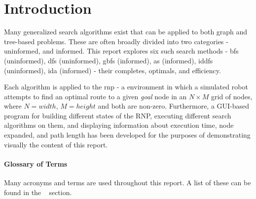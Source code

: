 \section{Introduction} %
\label{sec:introduction}
Many generalized search algorithms exist that can be applied to both graph and tree-based problems. These are often broadly divided into two categories - \Gls{uninformed}, and \Gls{informed}. This report explores six such search methods - \acrfull{bfs} (uninformed), \acrfull{dfs} (uninformed), \acrfull{gbfs} (informed), \acrfull{as} (informed), \acrfull{iddfs} (uninformed), \acrfull{ida} (informed) - their \glspl{complete}, \glspl{optimal}, and efficiency. \par
Each algorithm is applied to the \acrlong{rnp} - a \Gls{environment} in which a simulated robot attempts to find an optimal route to a given \textit{goal} \gls{node} in an $N \times M$ grid of nodes, where $N=width$, $M=height$ and both are non-zero. Furthermore, a GUI-based program for building different states of the RNP, executing different search algorithms on them, and displaying information about execution time, node expanded, and path length has been developed for the purposes of demonstrating visually the content of this report.

\paragraph{Glossary of Terms} %
\label{par:glossary_of_terms}
Many acronyms and terms are used throughout this report. A list of these can be found in the ~\pageref{glossaries} section.
